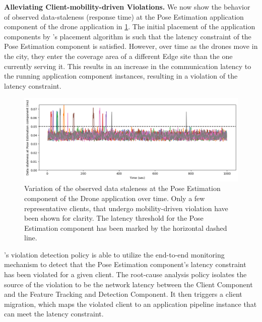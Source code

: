 \par \noindent \textbf{Alleviating Client-mobility-driven Violations.} We now show the behavior of observed data-staleness (response time) at the Pose Estimation application component of the drone application in \cref{fig:drone_latencies}. The initial placement of the application components by \oneedge{}'s placement algorithm is such that the latency constraint of the Pose Estimation component is satisfied. However, over time as the drones move in the city, they enter the coverage area of a different Edge site than the one currently serving it. This results in an increase in the communication latency to the running application component instances, resulting in a violation of the latency constraint. 
\begin{figure}[ht]
  \centering
    \includegraphics[width=0.8\columnwidth]{figures/oneedge/drone_latencies.png}
    \caption{Variation of the observed data staleness at the Pose Estimation component of the Drone application over time. Only a few representative clients, that undergo mobility-driven violation have been shown for clarity. The latency threshold for the Pose Estimation component has been marked by the horizontal dashed line.}
    \label{fig:drone_latencies}
\end{figure}
\par \oneedge{}'s violation detection policy is able to utilize the end-to-end monitoring mechanism to detect that the Pose Estimation component's latency constraint has been violated for a given client. The root-cause analysis policy isolates the source of the violation to be the network latency between the Client Component and the Feature Tracking and Detection Component. It then triggers a client migration, which maps the violated client to an application pipeline instance that can meet the latency constraint.\\

